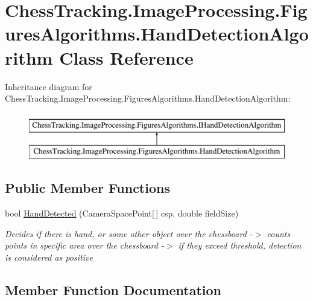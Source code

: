 \hypertarget{class_chess_tracking_1_1_image_processing_1_1_figures_algorithms_1_1_hand_detection_algorithm}{}\section{Chess\+Tracking.\+Image\+Processing.\+Figures\+Algorithms.\+Hand\+Detection\+Algorithm Class Reference}
\label{class_chess_tracking_1_1_image_processing_1_1_figures_algorithms_1_1_hand_detection_algorithm}
Inheritance diagram for Chess\+Tracking.\+Image\+Processing.\+Figures\+Algorithms.\+Hand\+Detection\+Algorithm\+:\begin{figure}[H]
\begin{center}
\leavevmode
\includegraphics[height=2.000000cm]{class_chess_tracking_1_1_image_processing_1_1_figures_algorithms_1_1_hand_detection_algorithm}
\end{center}
\end{figure}
\subsection*{Public Member Functions}
\begin{DoxyCompactItemize}
\item 
bool \mbox{\hyperlink{class_chess_tracking_1_1_image_processing_1_1_figures_algorithms_1_1_hand_detection_algorithm_ada180b5bf765c8e319871e13a5a23079}{Hand\+Detected}} (Camera\+Space\+Point\mbox{[}$\,$\mbox{]} csp, double field\+Size)
\begin{DoxyCompactList}\small\item\em Decides if there is hand, or some other object over the chessboard -\/$>$ counts points in specific area over the chessboard -\/$>$ if they exceed threshold, detection is considered as positive \end{DoxyCompactList}\end{DoxyCompactItemize}


\subsection{Member Function Documentation}
\mbox{\label{class_chess_tracking_1_1_image_processing_1_1_figures_algorithms_1_1_hand_detection_algorithm_ada180b5bf765c8e319871e13a5a23079}} 

